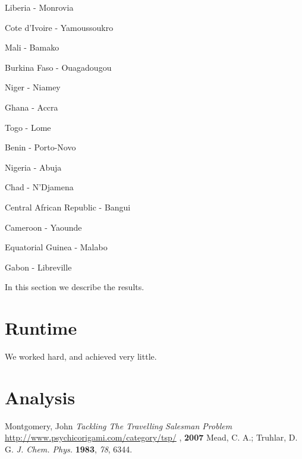 \documentclass[12pt]{article}
\begin{document}
\begin{multicols}{3}
\begin{enumerate*}
\item Liberia - Monrovia
\item Cote d'Ivoire - Yamoussoukro
\item Mali - Bamako
\item Burkina Faso - Ouagadougou
\item Niger - Niamey
\item Ghana - Accra
\item Togo - Lome
\item Benin - Porto-Novo
\item Nigeria - Abuja
\item Chad - N'Djamena
\item Central African Republic - Bangui
\item Cameroon - Yaounde
\item Equatorial Guinea - Malabo
\item Gabon - Libreville
\end{enumerate*}
\end{multicols}

In this section we describe the results.

\section{Runtime}
We worked hard, and achieved very little.

\section{Analysis}

\begin{thebibliography}{99}
 Montgomery, John {\it Tackling The Travelling Salesman Problem}{\href{http://www.psychicorigami.com/category/tsp/}{ http://www.psychicorigami.com/category/tsp/} }, {\bf 2007}
 Mead, C. A.; Truhlar, D. G. {\it J. Chem. Phys.} {\bf 1983}, {\it 78}, 6344.
\end{thebibliography}
\end{document}
